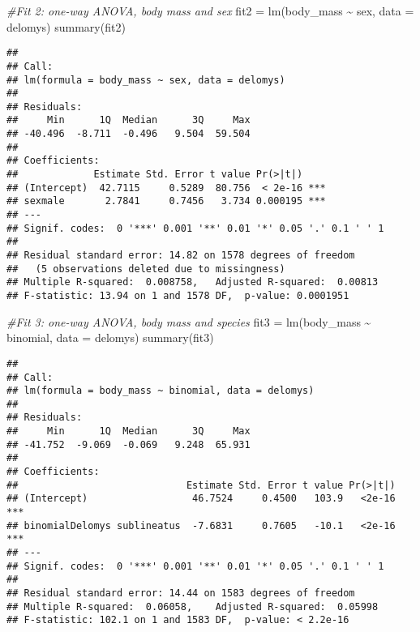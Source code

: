 \documentclass[
]{article}
\newenvironment{Shaded}{\begin{snugshade}}{\end{snugshade}}
\newcommand{\AttributeTok}[1]{\textcolor[rgb]{0.77,0.63,0.00}{#1}}
\newcommand{\CommentTok}[1]{\textcolor[rgb]{0.56,0.35,0.01}{\textit{#1}}}
\newcommand{\FunctionTok}[1]{\textcolor[rgb]{0.00,0.00,0.00}{#1}}
\newcommand{\NormalTok}[1]{#1}
\newcommand{\OtherTok}[1]{\textcolor[rgb]{0.56,0.35,0.01}{#1}}
\newcommand{\SpecialCharTok}[1]{\textcolor[rgb]{0.00,0.00,0.00}{#1}}
\begin{document}
\begin{Shaded}
\begin{Highlighting}[]
\CommentTok{\#Fit 2: one{-}way ANOVA, body mass and sex}
\NormalTok{fit2 }\OtherTok{=} \FunctionTok{lm}\NormalTok{(body\_mass }\SpecialCharTok{\textasciitilde{}}\NormalTok{ sex, }\AttributeTok{data =}\NormalTok{ delomys)}
\FunctionTok{summary}\NormalTok{(fit2)}
\end{Highlighting}
\end{Shaded}

\begin{verbatim}
## 
## Call:
## lm(formula = body_mass ~ sex, data = delomys)
## 
## Residuals:
##     Min      1Q  Median      3Q     Max 
## -40.496  -8.711  -0.496   9.504  59.504 
## 
## Coefficients:
##             Estimate Std. Error t value Pr(>|t|)    
## (Intercept)  42.7115     0.5289  80.756  < 2e-16 ***
## sexmale       2.7841     0.7456   3.734 0.000195 ***
## ---
## Signif. codes:  0 '***' 0.001 '**' 0.01 '*' 0.05 '.' 0.1 ' ' 1
## 
## Residual standard error: 14.82 on 1578 degrees of freedom
##   (5 observations deleted due to missingness)
## Multiple R-squared:  0.008758,   Adjusted R-squared:  0.00813 
## F-statistic: 13.94 on 1 and 1578 DF,  p-value: 0.0001951
\end{verbatim}

\begin{Shaded}
\begin{Highlighting}[]
\CommentTok{\#Fit 3: one{-}way ANOVA, body mass and species}
\NormalTok{fit3 }\OtherTok{=} \FunctionTok{lm}\NormalTok{(body\_mass }\SpecialCharTok{\textasciitilde{}}\NormalTok{ binomial, }\AttributeTok{data =}\NormalTok{ delomys)}
\FunctionTok{summary}\NormalTok{(fit3)}
\end{Highlighting}
\end{Shaded}

\begin{verbatim}
## 
## Call:
## lm(formula = body_mass ~ binomial, data = delomys)
## 
## Residuals:
##     Min      1Q  Median      3Q     Max 
## -41.752  -9.069  -0.069   9.248  65.931 
## 
## Coefficients:
##                             Estimate Std. Error t value Pr(>|t|)    
## (Intercept)                  46.7524     0.4500   103.9   <2e-16 ***
## binomialDelomys sublineatus  -7.6831     0.7605   -10.1   <2e-16 ***
## ---
## Signif. codes:  0 '***' 0.001 '**' 0.01 '*' 0.05 '.' 0.1 ' ' 1
## 
## Residual standard error: 14.44 on 1583 degrees of freedom
## Multiple R-squared:  0.06058,    Adjusted R-squared:  0.05998 
## F-statistic: 102.1 on 1 and 1583 DF,  p-value: < 2.2e-16
\end{verbatim}
\end{document}
